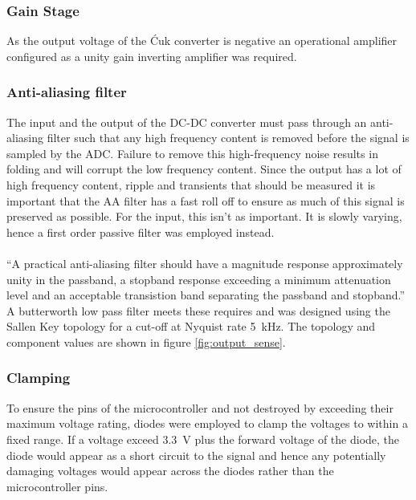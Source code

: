 \subsubsection{Gain Stage}
As the output voltage of the \'Cuk converter is negative an operational amplifier configured as a unity gain inverting amplifier was required.


\subsubsection{Anti-aliasing filter}
The input and the output of the DC-DC converter must pass through an anti-aliasing filter such that any high frequency content is removed before the signal is sampled by the ADC. Failure to remove this high-frequency noise results in folding and will corrupt the low frequency content. Since the output has a lot of high frequency content, ripple and transients that should be measured it is important that the AA filter has a fast roll off to ensure as much of this signal is preserved as possible. For the input, this isn’t as important. It is slowly varying, hence a first order passive filter was employed instead.
\\ \\
``A practical anti-aliasing filter should have a magnitude response approximately unity in the passband, a stopband response exceeding a minimum attenuation level and an acceptable transistion band separating the passband and stopband.'' \cite{dsp} A butterworth low pass filter meets these requires and was designed using the Sallen Key topology for a cut-off at Nyquist rate \SI{5}{kHz}. The topology and component values are shown in figure \ref{fig:output_sense}.

\subsubsection{Clamping}
To ensure the pins of the microcontroller and not destroyed by exceeding their maximum voltage rating, diodes were employed to clamp the voltages to within a fixed range. If a voltage exceed \SI{3.3}{V} plus the forward voltage of the diode, the diode would appear as a short circuit to the signal and hence any potentially damaging voltages would appear across the diodes rather than the microcontroller pins.

